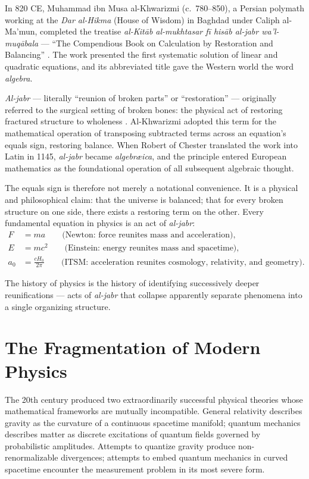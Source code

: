\documentclass[aps,prd,11pt,onecolumn,superscriptaddress,nofootinbib,floatfix]{revtex4-2}
\begin{document}
In 820 CE, Muhammad ibn Musa al-Khwarizmi (c.~780--850), a Persian polymath working at the \textit{Dar al-Hikma} (House of Wisdom) in Baghdad under Caliph al-Ma'mun, completed the treatise \textit{al-Kit\=ab al-mukhtasar f\=i his\=ab al-jabr wa'l-muq\=abala} --- ``The Compendious Book on Calculation by Restoration and Balancing'' \cite{alkhwarizmi_1831}. The work presented the first systematic solution of linear and quadratic equations, and its abbreviated title gave the Western world the word \textit{algebra}.

\textit{Al-jabr} --- literally ``reunion of broken parts'' or ``restoration'' --- originally referred to the surgical setting of broken bones: the physical act of restoring fractured structure to wholeness \cite{muslimheritage}. Al-Khwarizmi adopted this term for the mathematical operation of transposing subtracted terms across an equation's equals sign, restoring balance. When Robert of Chester translated the work into Latin in 1145, \textit{al-jabr} became \textit{algebr\ae ica}, and the principle entered European mathematics as the foundational operation of all subsequent algebraic thought.

The equals sign is therefore not merely a notational convenience. It is a physical and philosophical claim: that the universe is balanced; that for every broken structure on one side, there exists a restoring term on the other. Every fundamental equation in physics is an act of \textit{al-jabr}:
\begin{align}
    F &= ma \qquad \text{(Newton: force reunites mass and acceleration)}, \\
    E &= mc^2 \qquad \text{(Einstein: energy reunites mass and spacetime)}, \\
    a_0 &= \frac{cH_0}{2\pi} \qquad \text{(ITSM: acceleration reunites cosmology, relativity, and geometry)}.
\end{align}

The history of physics is the history of identifying successively deeper reunifications --- acts of \textit{al-jabr} that collapse apparently separate phenomena into a single organizing structure.

\section{The Fragmentation of Modern Physics}
\label{sec:fragmentation}

The 20th century produced two extraordinarily successful physical theories whose mathematical frameworks are mutually incompatible. General relativity describes gravity as the curvature of a continuous spacetime manifold; quantum mechanics describes matter as discrete excitations of quantum fields governed by probabilistic amplitudes. Attempts to quantize gravity produce non-renormalizable divergences; attempts to embed quantum mechanics in curved spacetime encounter the measurement problem in its most severe form.
\end{document}
